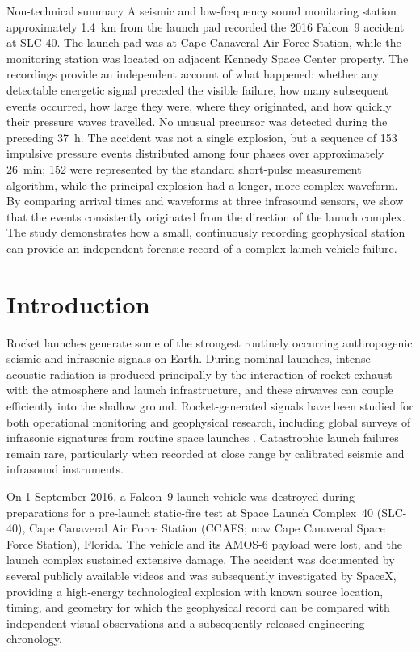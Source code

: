 \documentclass[]{seismica}
\begin{document}
{  %
  \begin{summary}{Non-technical summary}
  A seismic and low-frequency sound monitoring station approximately
  \SI{1.4}{\kilo\metre} from the launch pad recorded the 2016 Falcon~9
  accident at SLC-40. The launch pad was at Cape Canaveral Air Force Station,
  while the monitoring station was located on adjacent Kennedy Space Center
  property. The recordings provide an independent account of what happened:
  whether any detectable energetic signal preceded the visible failure, how
  many subsequent events occurred, how large they were, where they originated,
  and how quickly their pressure waves travelled. No unusual precursor was
  detected during the preceding \SI{37}{\hour}. The accident was not a single
  explosion, but a sequence of 153 impulsive pressure events distributed
  among four phases over approximately \SI{26}{\minute}; 152 were represented
  by the standard short-pulse measurement algorithm, while the principal
  explosion had a longer, more complex waveform. By comparing arrival times and waveforms at
  three infrasound sensors, we show that the events consistently originated
  from the direction of the launch complex. The study demonstrates how a
  small, continuously recording geophysical station can provide an independent
  forensic record of a complex launch-vehicle failure.
  \end{summary}
}


\section{Introduction}
\label{sec:introduction}

Rocket launches generate some of the strongest routinely occurring
anthropogenic seismic and infrasonic signals on Earth. During nominal launches,
intense acoustic radiation is produced principally by the interaction of rocket
exhaust with the atmosphere and launch infrastructure, and these airwaves can
couple efficiently into the shallow ground. Rocket-generated signals have been
studied for both operational monitoring and geophysical research, including
global surveys of infrasonic signatures from routine space launches
\citep{pilger_rocket_2021}. Catastrophic launch failures remain rare,
particularly when recorded at close range by calibrated seismic and infrasound
instruments.

On 1 September 2016, a Falcon~9 launch vehicle was destroyed during
preparations for a pre-launch static-fire test at Space Launch Complex~40
(SLC-40), Cape Canaveral Air Force Station (CCAFS; now Cape Canaveral Space
Force Station), Florida. The vehicle and its AMOS-6 payload were lost, and the
launch complex sustained extensive damage. The accident was documented by
several publicly available videos and was subsequently investigated by SpaceX,
providing a high-energy technological explosion with known source location,
timing, and geometry for which the geophysical record can be compared with
independent visual observations and a subsequently released engineering
chronology.
\end{document}

